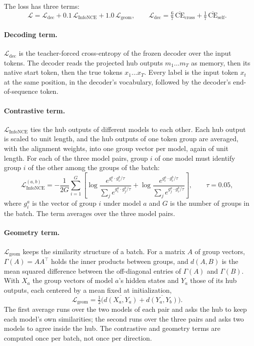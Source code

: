 The loss has three terms:
\begin{equation}
\mathcal{L} = \mathcal{L}_{\text{dec}} + 0.1\,\mathcal{L}_{\text{InfoNCE}} + 1.0\,\mathcal{L}_{\text{geom}},
\qquad
\mathcal{L}_{\text{dec}} = \tfrac{6}{7}\,\overline{\text{CE}}_{\text{cross}} + \tfrac{1}{7}\,\overline{\text{CE}}_{\text{self}} .
\label{eq:hub:loss}
\end{equation}

\paragraph{Decoding term.} $\mathcal{L}_{\text{dec}}$ is the teacher-forced cross-entropy of the frozen decoder over the input tokens. The decoder reads the projected hub outputs $m_1 \ldots m_T$ as memory, then its native start token, then the true tokens $x_1 \ldots x_T$. Every label is the input token $x_t$ at the same position, in the decoder's vocabulary, followed by the decoder's end-of-sequence token.

\paragraph{Contrastive term.} $\mathcal{L}_{\text{InfoNCE}}$ ties the hub outputs of different models to each other. Each hub output is scaled to unit length, and the hub outputs of one token group are averaged, with the alignment weights, into one group vector per model, again of unit length. For each of the three model pairs, group $i$ of one model must identify group $i$ of the other among the groups of the batch:
\begin{equation}
\mathcal{L}_{\text{InfoNCE}}^{(a,b)} = -\frac{1}{2G}\sum_{i=1}^{G}\left[\log\frac{e^{g^a_i\cdot g^b_i/\tau}}{\sum_j e^{g^a_i\cdot g^b_j/\tau}} + \log\frac{e^{g^a_i\cdot g^b_i/\tau}}{\sum_j e^{g^a_j\cdot g^b_i/\tau}}\right],
\qquad \tau = 0.05 ,
\label{eq:hub:infonce}
\end{equation}
where $g^a_i$ is the vector of group $i$ under model $a$ and $G$ is the number of groups in the batch. The term averages over the three model pairs.

\paragraph{Geometry term.} $\mathcal{L}_{\text{geom}}$ keeps the similarity structure of a batch. For a matrix $A$ of group vectors, $\Gamma(A) = AA^{\top}$ holds the inner products between groups, and $d(A,B)$ is the mean squared difference between the off-diagonal entries of $\Gamma(A)$ and $\Gamma(B)$. With $X_a$ the group vectors of model $a$'s hidden states and $Y_a$ those of its hub outputs, each centered by a mean fixed at initialization,
\begin{equation}
\mathcal{L}_{\text{geom}} = \tfrac{1}{2}\Big(\overline{d(X_a, Y_a)} + \overline{d(Y_a, Y_b)}\Big).
\label{eq:hub:geom}
\end{equation}
The first average runs over the two models of each pair and asks the hub to keep each model's own similarities; the second runs over the three pairs and asks two models to agree inside the hub. The contrastive and geometry terms are computed once per batch, not once per direction.


